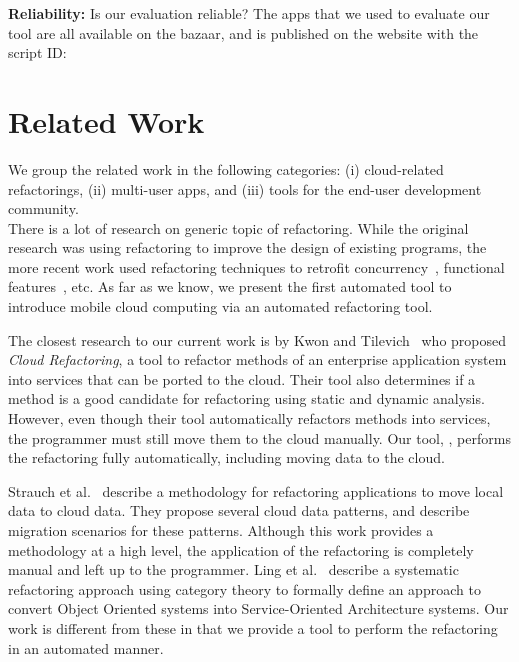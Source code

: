 \documentclass[preprint]{sigplanconf}
\begin{document}
\textbf{Reliability:} Is our evaluation reliable? The apps that we used to evaluate our tool are all available on the \TD bazaar, and \tool is published on the \TD website with the script ID: 




\section{Related Work}
\label{sec:relatedWork}

We group the related work in the following categories: (i) cloud-related refactorings, (ii) multi-user apps, and (iii) tools for the end-user development community. \\

There is a lot of research on generic topic of refactoring. While the original research was using refactoring to improve the design of existing programs, the more recent work used refactoring techniques to retrofit 
concurrency~\cite{wloka2009refactoring,dig2009refactoring}, functional features~\cite{Gyori:Lambdaficator}, etc.
As far as we know, we present the first automated tool to introduce mobile cloud computing via an automated refactoring tool.

The closest research to our current work is by Kwon and Tilevich~\cite{kwon2013cloud} who proposed \emph{Cloud Refactoring}, a tool to refactor methods of an enterprise application system into services that can be  ported to the cloud. Their tool also determines if a method is a good candidate for refactoring using static and dynamic analysis. However, even though their tool automatically refactors methods into services, the programmer must still move them to the cloud manually.  
Our tool, \tool, performs the refactoring fully automatically, including moving data to the cloud.  


Strauch et al.~\cite{strauchmigrating} describe a methodology for refactoring applications to move local data to cloud data. They propose several cloud data patterns, and describe migration scenarios for these patterns. Although this work provides a methodology at a high level, the application of the refactoring is completely manual and left up to the programmer. 
Ling et al.~\cite{ling2010refactoring} describe a systematic refactoring approach 
using category theory to formally define an approach to convert Object Oriented systems 
into Service-Oriented Architecture systems. 
Our work is different from these in that we provide a tool to perform the refactoring in an automated manner.
\end{document}

